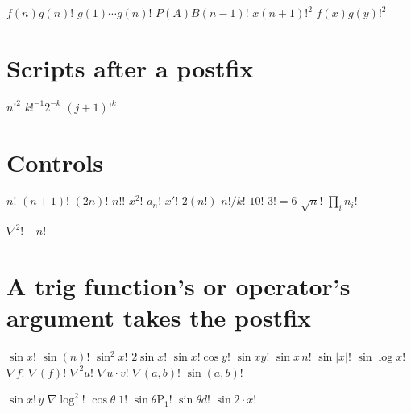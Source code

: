 \documentclass{article}
\begin{document}
$f(n)g(n)!$ $g(1)\cdots g(n)!$ $P(A)B(n-1)!$ $x(n+1)!^{2}$ $f(x)g(y)!^{2}$

\section{Scripts after a postfix}
$n!^{2}$ $k!^{-1}2^{-k}$ $(j+1)!^{k}$

\section{Controls}
$n!$ $(n+1)!$ $(2n)!$ $n!!$ $x^{2}!$ $a_n!$ $x'!$ $2(n!)$ $n!/k!$ $10!$ $3!=6$ $\sqrt{n}!$ $\prod_{i}n_{i}!$

$\nabla^{2}!$ $-n!$

\section{A trig function's or operator's argument takes the postfix}
$\sin x!$ $\sin(n)!$ $\sin^{2}x!$ $2\sin x!$ $\sin x!\cos y!$ $\sin xy!$ $\sin x\,n!$ $\sin|x|!$ $\sin\log x!$
$\nabla f!$ $\nabla(f)!$ $\nabla^{2}u!$ $\nabla u\cdot v!$ $\nabla(a,b)!$ $\sin(a,b)!$

$\sin x!\,y$ $\nabla\log^{2}!$ $\cos\theta\;1!$ $\sin\theta\mathrm{P}_1!$ $\sin\theta d!$ $\sin 2\cdot x!$
\end{document}
